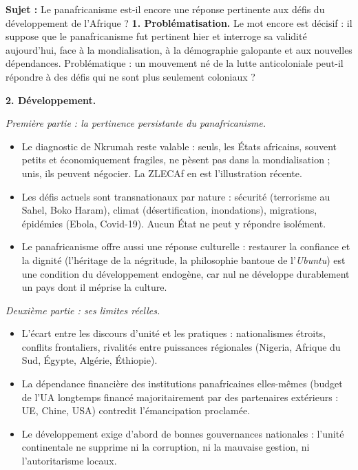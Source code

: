 \documentclass[11pt]{article}
\newcommand{\cle}[1]{{\popxbold\color{popdark}#1}}
\begin{document}
\begin{exoresolu}
\textbf{Sujet :} Le panafricanisme est-il encore une réponse pertinente aux défis du développement de l'Afrique ?
\tcblower
\textbf{1. Problématisation.} Le mot \cle{encore} est décisif : il suppose que le panafricanisme fut pertinent hier et interroge sa validité aujourd'hui, face à la mondialisation, à la démographie galopante et aux nouvelles dépendances. Problématique : un mouvement né de la lutte anticoloniale peut-il répondre à des défis qui ne sont plus seulement coloniaux ?

\textbf{2. Développement.}

\emph{Première partie : la pertinence persistante du panafricanisme.}
\begin{itemize}
\item Le diagnostic de Nkrumah reste valable : seuls, les États africains, souvent petits et économiquement fragiles, ne pèsent pas dans la mondialisation ; unis, ils peuvent négocier. La ZLECAf en est l'illustration récente.
\item Les défis actuels sont transnationaux par nature : sécurité (terrorisme au Sahel, Boko Haram), climat (désertification, inondations), migrations, épidémies (Ebola, Covid-19). Aucun État ne peut y répondre isolément.
\item Le panafricanisme offre aussi une réponse culturelle : restaurer la confiance et la dignité (l'héritage de la négritude, la philosophie bantoue de l'\emph{Ubuntu}) est une condition du développement endogène, car nul ne développe durablement un pays dont il méprise la culture.
\end{itemize}

\emph{Deuxième partie : ses limites réelles.}
\begin{itemize}
\item L'écart entre les discours d'unité et les pratiques : nationalismes étroits, conflits frontaliers, rivalités entre puissances régionales (Nigeria, Afrique du Sud, Égypte, Algérie, Éthiopie).
\item La dépendance financière des institutions panafricaines elles-mêmes (budget de l'UA longtemps financé majoritairement par des partenaires extérieurs : UE, Chine, USA) contredit l'émancipation proclamée.
\item Le développement exige d'abord de bonnes gouvernances nationales : l'unité continentale ne supprime ni la corruption, ni la mauvaise gestion, ni l'autoritarisme locaux.
\end{itemize}


\end{exoresolu}
\end{document}
